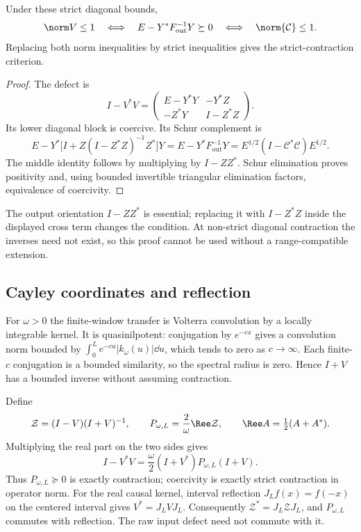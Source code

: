 \begin{proposition}\label{prop:si-gluing}
Under these strict diagonal bounds,
\begin{equation}\label{eq:si-gluing}
 \norm V\leq1
 \quad\Longleftrightarrow\quad
 E-Y^*F_{\mathrm{out}}^{-1}Y\succeq0
 \quad\Longleftrightarrow\quad\norm{\mathcal C}\leq1.
\end{equation}
Replacing both norm inequalities by strict inequalities gives
the strict-contraction criterion.
\end{proposition}
\begin{proof}
The defect is
\[
 I-V^*V=
 \begin{pmatrix}
 E-Y^*Y&-Y^*Z\\
 -Z^*Y&I-Z^*Z
 \end{pmatrix}.
\]
Its lower diagonal block is coercive. Its Schur complement is
\[
 E-Y^*\bigl[I+Z(I-Z^*Z)^{-1}Z^*\bigr]Y
 =E-Y^*F_{\mathrm{out}}^{-1}Y
 =E^{1/2}(I-\mathcal C^*\mathcal C)E^{1/2}.
\]
The middle identity follows by multiplying by $I-ZZ^*$.
Schur elimination proves positivity and, using bounded invertible
triangular elimination factors, equivalence of coercivity.
\end{proof}
The output orientation $I-ZZ^*$ is essential; replacing it with
$I-Z^*Z$ inside the displayed cross term changes the condition.
At non-strict diagonal contraction the inverses need not exist,
so this proof cannot be used without a range-compatible extension.

\subsection{Cayley coordinates and reflection}

For $\omega>0$ the finite-window transfer is Volterra convolution
by a locally integrable kernel. It is quasinilpotent: conjugation
by $e^{-cx}$ gives a convolution norm bounded by
$\int_0^L e^{-cu}|k_\omega(u)|\dd u$, which tends to zero as
$c\to\infty$. Each finite-$c$ conjugation is a bounded similarity,
so the spectral radius is zero. Hence $I+V$ has a bounded inverse
without assuming contraction.

Define
\begin{equation}
 \mathcal Z=(I-V)(I+V)^{-1},\qquad
 P_{\omega,L}=\frac2\omega\Ree\mathcal Z,\qquad
 \Ree A=\tfrac12(A+A^*).
\end{equation}
Multiplying the real part on the two sides gives
\begin{equation}\label{eq:si-congruence}
 I-V^*V=\frac\omega2(I+V^*)P_{\omega,L}(I+V).
\end{equation}
Thus $P_{\omega,L}\succeq0$ is exactly contraction; coercivity
is exactly strict contraction in operator norm.
For the real causal kernel, interval reflection
$J_Lf(x)=f(-x)$ on the centered interval gives
$V^*=J_LVJ_L$. Consequently $\mathcal Z^*=J_L\mathcal ZJ_L$,
and $P_{\omega,L}$ commutes with reflection. The raw input
defect need not commute with it.

